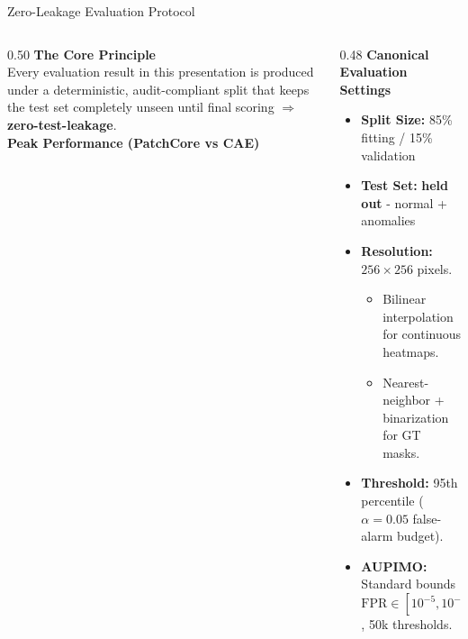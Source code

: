 \documentclass[aspectratio=169,10pt]{beamer}
\begin{document}
\begin{frame}{Zero-Leakage Evaluation Protocol}
\begin{columns}[T]
  \begin{column}{0.50\textwidth}
    \textbf{The Core Principle}\\[8pt]
    {\small Every evaluation result in this presentation is produced under a
    deterministic, audit-compliant split that keeps the test set completely
    unseen until final scoring $\Rightarrow$ \textbf{zero-test-leakage}.}\\[8pt]
    
    \vspace{12pt}
    \textbf{Peak Performance (PatchCore vs CAE)}\\[4pt]
  \end{column}
  \begin{column}{0.48\textwidth}
    \textbf{Canonical Evaluation Settings}\\[6pt]
    \begin{itemize}
      \item \textbf{Split Size:} 85\% fitting / 15\% validation
      \item \textbf{Test Set:} \textbf{held out} - normal + anomalies
      \item \textbf{Resolution:} $256 \times 256$ pixels.
        \begin{itemize}
          \item Bilinear interpolation for continuous heatmaps.
          \item Nearest-neighbor + binarization for GT masks.
        \end{itemize}
      \item \textbf{Threshold:} 95th percentile ($\alpha=0.05$ false-alarm budget).
      \item \textbf{AUPIMO:} Standard bounds $\text{FPR} \in [10^{-5}, 10^{-4}]$, 50k thresholds.
    \end{itemize}
  \end{column}
\end{columns}
\end{frame}
\end{document}
